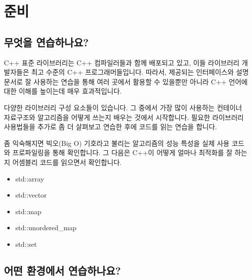 \chapter{준비}

\section{무엇을 연습하나요?}

C++ 표준 라이브러리는 C++ 컴파일러들과 함께 배포되고 있고, 이들 라이브러리 개발자들은 
최고 수준의 C++ 프로그래머들입니다. 따라서, 제공되는 인터페이스와 설명 문서로 잘 
사용하는 연습을 통해 여러 곳에서 활용할 수 있을뿐만 아니라 C++ 언어에 대한 이해를 
높이는데 매우 효과적입니다. 

다양한 라이브러리 구성 요소들이 있습니다. 그 중에서 가장 많이 사용하는 컨테이너 자료구조와 
알고리즘을 어떻게 쓰는지 배우는 것에서 시작합니다. 필요한 라이브러리 사용법들을 추가로 
좀 더 살펴보고 연습한 후에 코드를 읽는 연습을 합니다. 

좀 익숙해지면 빅오(Big O) 기호라고 불리는 알고리즘의 성능 특성을 실제 사용 코드와 
프로파일링을 통해 확인합니다. 그 다음은 C++이 어떻게 얼마나 최적화를 잘 하는지 
어셈블리 코드를 읽으면서 확인합니다. 


\begin{itemize}
    \item std::array 
    \item std::vector 
    \item std::map
    \item std::unordered\_map 
    \item std::set 
\end{itemize}


\section{어떤 환경에서 연습하나요?}










